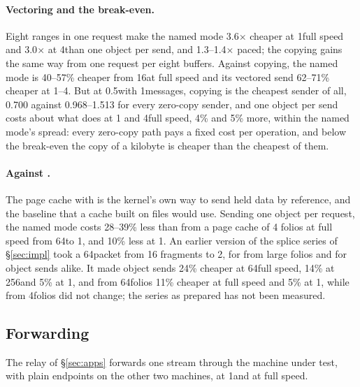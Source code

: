 \paragraph{Vectoring and the break-even.} Eight ranges in one request make the named mode
3.6$\times$ cheaper at 1\KiB full speed and 3.0$\times$ at 4\KiB than one object per send, and
1.3--1.4$\times$ paced; the copying  gains the same way from one request per eight
buffers. %
Against copying, the named mode is 40--57\% cheaper from 16\KiB at full speed and its vectored
send 62--71\% cheaper at 1--4\KiB. But at 0.5\GBs with 1\KiB messages, copying is the cheapest
sender of all, 0.700 against 0.968--1.513 for every zero-copy sender, and one object per send
costs about what  does at 1 and 4\KiB full speed, 4\% and 5\% more, within the
named mode's spread: every zero-copy path pays a fixed cost per operation, and below the
break-even the copy of a kilobyte is cheaper than the cheapest of them. %

\paragraph{Against \sendfile.} The page cache with \sendfile is the kernel's own way to send held
data by reference, and the baseline that a cache built on files would use. Sending one object
per request, the named mode costs 28--39\% less than \sendfile from a page cache of 4\KiB
folios at full speed from 64\KiB to 1\MiB, and 10\% less at 1\GBs. %
An earlier version of the splice series of \S\ref{sec:impl} took a 64\KiB packet from 16
fragments to 2, for \sendfile from large folios and for object sends alike. It made object
sends 24\% cheaper at 64\KiB full speed, 14\% at 256\KiB and 5\% at 1\GBs, and \sendfile
from 64\KiB folios 11\% cheaper at full speed and 5\% at 1\GBs, while \sendfile from
4\KiB folios did not change; the series as prepared has not been measured.

\subsection{Forwarding}
\label{sec:eval:fwd}

The relay of \S\ref{sec:apps} forwards one stream through the machine under test, with plain
endpoints on the other two machines, at 1\GBs and at full speed.

